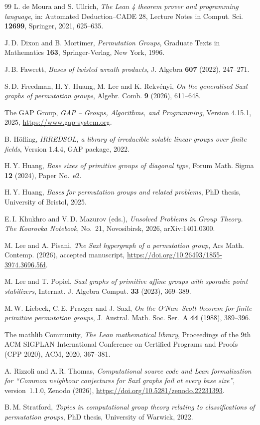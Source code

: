 \documentclass[a4paper,reqno,11pt]{amsart}
\numberwithin{equation}{section}
\begin{document}
\begin{thebibliography}{99}
 L. de Moura and S. Ullrich,
{\it The Lean 4 theorem prover and programming language},
in: Automated Deduction--CADE 28, Lecture Notes in Comput. Sci.
{\bf 12699}, Springer, 2021, 625--635.

 J.\,D. Dixon and B. Mortimer, {\it Permutation Groups}, Graduate Texts in Mathematics {\bf 163}, Springer-Verlag, New York, 1996.

 J.\,B. Fawcett, {\it Bases of twisted wreath products}, J. Algebra {\bf 607} (2022), 247--271.

 S.\,D. Freedman, H.\,Y. Huang, M. Lee and K. Rekv\'enyi, {\it On the generalised Saxl graphs of permutation groups}, Algebr. Comb. {\bf 9} (2026), 611--648.

 The GAP Group, {\it GAP -- Groups, Algorithms, and Programming}, Version 4.15.1, 2025, \url{https://www.gap-system.org}.

 B. H\"ofling, {\it IRREDSOL, a library of irreducible soluble linear groups over finite fields}, Version 1.4.4, GAP package, 2022.

 H.\,Y. Huang, {\it Base sizes of primitive groups of diagonal type}, Forum Math. Sigma {\bf 12} (2024), Paper No.~e2.

 H.\,Y. Huang, {\it Bases for permutation groups and related problems}, PhD thesis, University of Bristol, 2025.

 E.\,I. Khukhro and V.\,D. Mazurov (eds.), {\it Unsolved Problems in Group Theory. The Kourovka Notebook}, No.~21, Novosibirsk, 2026, arXiv:1401.0300.

 M. Lee and A. Pisani, {\it The Saxl hypergraph of a permutation group}, Ars Math. Contemp. (2026), accepted manuscript, \url{https://doi.org/10.26493/1855-3974.3696.5fd}.

 M. Lee and T. Popiel, {\it Saxl graphs of primitive affine groups with sporadic point stabilizers}, Internat. J. Algebra Comput. {\bf 33} (2023), 369--389.

 M.\,W. Liebeck, C.\,E. Praeger and J. Saxl, {\it On the O'Nan--Scott theorem for finite primitive permutation groups}, J. Austral. Math. Soc. Ser.~A {\bf 44} (1988), 389--396.

 The mathlib Community,
{\it The Lean mathematical library},
Proceedings of the 9th ACM SIGPLAN International Conference on
Certified Programs and Proofs (CPP 2020), ACM, 2020, 367--381.

 A. Rizzoli and A.\,R. Thomas, {\it Computational source code and Lean formalization for ``Common neighbour conjectures for Saxl graphs fail at every base size''}, version~1.1.0, Zenodo (2026), \url{https://doi.org/10.5281/zenodo.22231393}.

 B.\,M. Stratford, {\it Topics in computational group theory relating to classifications of permutation groups}, PhD thesis, University of Warwick, 2022.

\end{thebibliography}
\end{document}

